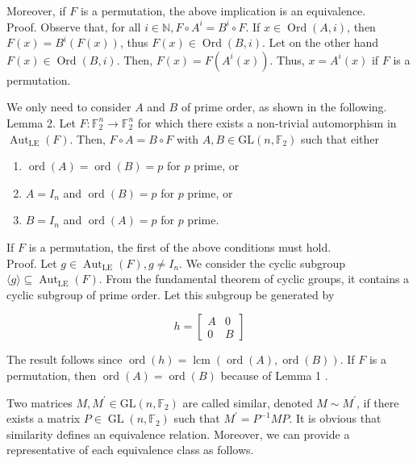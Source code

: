 \documentclass[10pt]{article}
\begin{document}
Moreover, if $F$ is a permutation, the above implication is an equivalence.\\
Proof. Observe that, for all $i \in \mathbb{N}, F \circ A^{i}=B^{i} \circ F$. If $x \in \operatorname{Ord}(A, i)$, then $F(x)= B^{i}(F(x))$, thus $F(x) \in \operatorname{Ord}(B, i)$. Let on the other hand $F(x) \in \operatorname{Ord}(B, i)$. Then, $F(x)=F\left(A^{i}(x)\right)$. Thus, $x=A^{i}(x)$ if $F$ is a permutation.

We only need to consider $A$ and $B$ of prime order, as shown in the following.\\
Lemma 2. Let $F: \mathbb{F}_{2}^{n} \rightarrow \mathbb{F}_{2}^{n}$ for which there exists a non-trivial automorphism in $\operatorname{Aut}_{\mathrm{LE}}(F)$. Then, $F \circ A=B \circ F$ with $A, B \in \mathrm{GL}\left(n, \mathbb{F}_{2}\right)$ such that either

\begin{enumerate}
  \item $\operatorname{ord}(A)=\operatorname{ord}(B)=p$ for $p$ prime, or
  \item $A=I_{n}$ and $\operatorname{ord}(B)=p$ for $p$ prime, or
  \item $B=I_{n}$ and $\operatorname{ord}(A)=p$ for $p$ prime.
\end{enumerate}

If $F$ is a permutation, the first of the above conditions must hold.\\
Proof. Let $g \in \operatorname{Aut}_{\mathrm{LE}}(F), g \neq I_{n}$. We consider the cyclic subgroup $\langle g\rangle \subseteq \operatorname{Aut}_{\mathrm{LE}}(F)$. From the fundamental theorem of cyclic groups, it contains a cyclic subgroup of prime order. Let this subgroup be generated by

$$
h=\left[\begin{array}{cc}
A & 0 \\
0 & B
\end{array}\right]
$$

The result follows since $\operatorname{ord}(h)=\operatorname{lcm}(\operatorname{ord}(A), \operatorname{ord}(B))$. If $F$ is a permutation, then $\operatorname{ord}(A)=\operatorname{ord}(B)$ because of Lemma 1 .

Two matrices $M, M^{\prime} \in \mathrm{GL}\left(n, \mathbb{F}_{2}\right)$ are called similar, denoted $M \sim M^{\prime}$, if there exists a matrix $P \in \operatorname{GL}\left(n, \mathbb{F}_{2}\right)$ such that $M^{\prime}=P^{-1} M P$. It is obvious that similarity defines an equivalence relation. Moreover, we can provide a representative of each equivalence class as follows.
\end{document}
